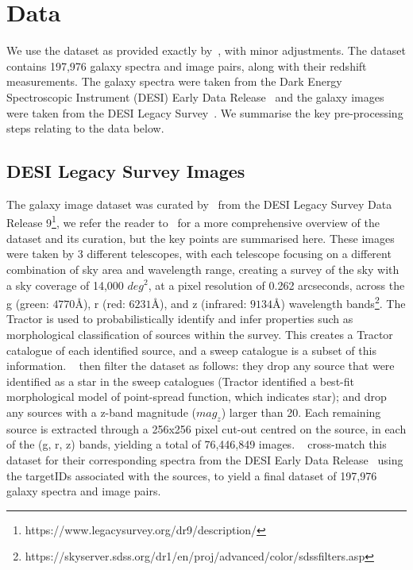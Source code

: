 
\section{Data}\label{sec:data}
We use the dataset as provided exactly by~\cite{astroclip}, with minor adjustments.
The dataset contains 197,976 galaxy spectra and image pairs, along with their redshift measurements.
The galaxy spectra were taken from the Dark Energy Spectroscopic Instrument (DESI) Early Data Release~\citep{desiearly2023}
and the galaxy images were taken from the DESI Legacy Survey~\citep{desilegacy2018}.
We summarise the key pre-processing steps relating to the data below.

\subsection{DESI Legacy Survey Images}\label{subsec:images}
The galaxy image dataset was curated by~\cite{stein2022} from the DESI Legacy Survey Data Release 9\footnote{https://www.legacysurvey.org/dr9/description/},
we refer the reader to~\cite{stein2022, astroclip} for a more comprehensive overview of the dataset and its curation, but the
key points are summarised here.
These images were taken by 3 different telescopes, with each telescope focusing on a different combination of sky area
and wavelength range, creating a survey of the sky with a sky coverage of 14,000 $deg^{2}$, at a pixel resolution of 0.262 arcseconds,
across the g (green: $4770 \si{\angstrom}$), r (red: $6231 \si{\angstrom}$), and z (infrared: $9134 \si{\angstrom}$) wavelength
bands\footnote{https://skyserver.sdss.org/dr1/en/proj/advanced/color/sdssfilters.asp}.
The Tractor is used to probabilistically identify and infer properties such
as morphological classification of sources within the survey.
This creates a Tractor catalogue of each identified source, and a sweep catalogue is a subset of this information.
~\cite{stein2022} then filter the dataset as follows: they drop any source that were identified as a star in the sweep catalogues
(Tractor identified a best-fit morphological model of point-spread function, which indicates star); and drop any sources
with a z-band magnitude ($mag_{z}$) larger than 20.
Each remaining source is extracted through a 256x256 pixel cut-out centred on the source, in each of the (g, r, z) bands,
yielding a total of 76,446,849 images.
~\cite{astroclip} cross-match this dataset for their corresponding spectra from the DESI Early Data Release~\citep{desiearly2023}
using the targetIDs associated with the sources, to yield a final dataset of 197,976 galaxy spectra and image pairs.


